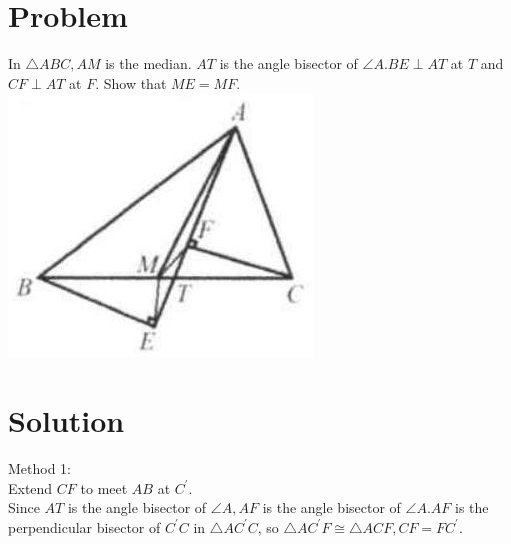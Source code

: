 \documentclass{article}
\begin{document}
\section*{Problem}
In \(\triangle A B C, A M\) is the median. \(A T\) is the angle bisector of \(\angle A . B E \perp A T\) at \(T\) and \(C F \perp A T\) at \(F\). Show that \(M E=M F\).\\
\centering
\includegraphics[width=\textwidth]{images/065(1).jpg}

\section*{Solution}
Method 1:\\
Extend \(C F\) to meet \(A B\) at \(C^{\prime}\).\\
Since \(A T\) is the angle bisector of \(\angle A, A F\) is the angle bisector of \(\angle A . A F\) is the perpendicular bisector of \(C^{\prime} C\) in \(\triangle A C^{\prime} C\), so \(\triangle A C^{\prime} F \cong \triangle A C F, C F=F C^{\prime}\).
\end{document}
